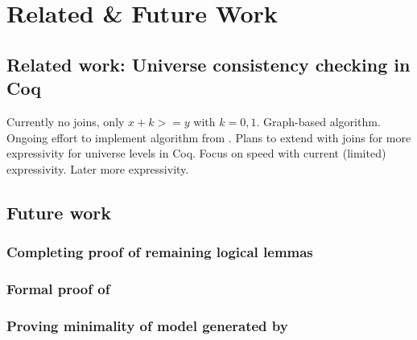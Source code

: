 \chapter{Related \& Future Work}

\section{Related work: Universe consistency checking in Coq}

Currently no joins, only $x + k >= y$ with $k = 0,1$.
Graph-based algorithm. Ongoing effort \cite{coqgithub} to implement algorithm from \cite{mbezem}.
Plans to extend with joins for more expressivity for universe levels in Coq.
Focus on speed with current (limited) expressivity. Later more expressivity.

\section{Future work}

\subsection{Completing proof of remaining logical lemmas}

\subsection{Formal proof of }

\subsection{Proving minimality of model generated by }
